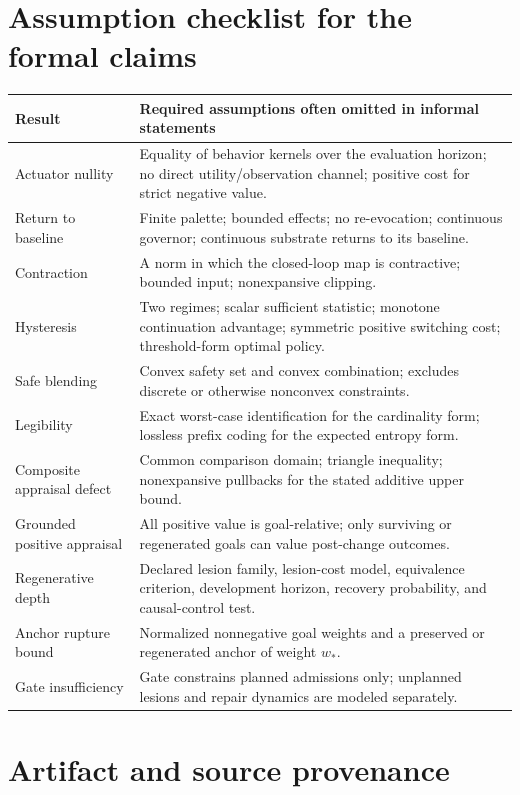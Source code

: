 \documentclass[11pt]{article}
\begin{document}
\appendix
\section{Assumption checklist for the formal claims}

\begin{longtable}{p{}p{}}
\toprule
Result & Required assumptions often omitted in informal statements \\
\midrule
Actuator nullity & Equality of behavior kernels over the evaluation horizon;
no direct utility/observation channel; positive cost for strict negative value. \\
Return to baseline & Finite palette; bounded effects; no re-evocation;
continuous governor; continuous substrate returns to its baseline. \\
Contraction & A norm in which the closed-loop map is contractive; bounded input;
nonexpansive clipping. \\
Hysteresis & Two regimes; scalar sufficient statistic; monotone continuation
advantage; symmetric positive switching cost; threshold-form optimal policy. \\
Safe blending & Convex safety set and convex combination; excludes discrete or
otherwise nonconvex constraints. \\
Legibility & Exact worst-case identification for the cardinality form; lossless
prefix coding for the expected entropy form. \\
Composite appraisal defect & Common comparison domain; triangle inequality;
nonexpansive pullbacks for the stated additive upper bound. \\
Grounded positive appraisal & All positive value is goal-relative; only
surviving or regenerated goals can value post-change outcomes. \\
Regenerative depth & Declared lesion family, lesion-cost model, equivalence
criterion, development horizon, recovery probability, and causal-control test. \\
Anchor rupture bound & Normalized nonnegative goal weights and a preserved or
regenerated anchor of weight $w_*$. \\
Gate insufficiency & Gate constrains planned admissions only; unplanned lesions
and repair dynamics are modeled separately. \\
\bottomrule
\end{longtable}

\section{Artifact and source provenance}
\end{document}
